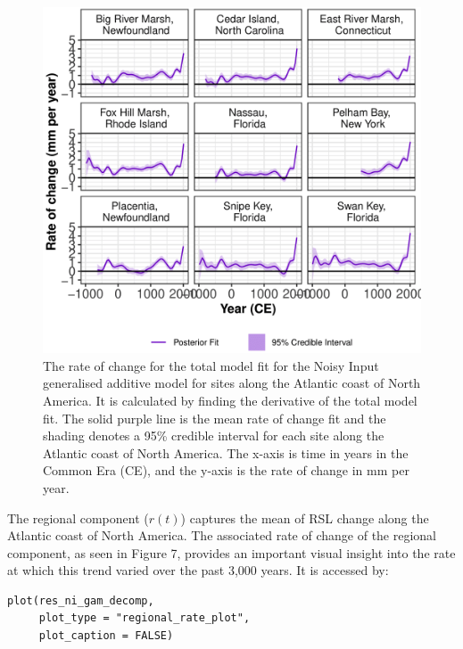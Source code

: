 \begin{figure}

{\centering \includegraphics[width=0.8\linewidth]{figures/niplotrate-1} 

}

\caption{The rate of change for the total model fit for the Noisy Input generalised additive model for sites along the Atlantic coast of North America. It is calculated by finding the derivative of the total model fit. The solid purple line is the mean rate of change fit and the shading denotes a 95\% credible interval for each site along the Atlantic coast of North America. The x-axis is time in years in the Common Era (CE), and the y-axis is the rate of change in mm per year.}\label{fig:niplotrateload}
\end{figure}

\normalsize

The regional component (\(r(t)\)) captures the mean of RSL change along the Atlantic coast of North America. The associated rate of change of the regional component, as seen in Figure 7, provides an important visual insight into the rate at which this trend varied over the past 3,000 years. It is accessed by:
\scriptsize

\begin{verbatim}
plot(res_ni_gam_decomp, 
     plot_type = "regional_rate_plot",
     plot_caption = FALSE)
\end{verbatim}

